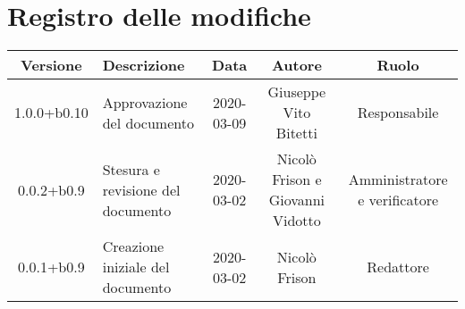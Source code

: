 \section*{Registro delle modifiche}

\begin{center}
	\begin{longtable}{|c|p{3cm}|c|c|c|}
	\hline
	\rowcolor{lighter-grayer}
	\textbf{Versione} & \textbf{Descrizione} & \textbf{Data} & \textbf{Autore} & \textbf{Ruolo} \\
	\hline
	\endfirsthead


	1.0.0+b0.10 & Approvazione del documento & 2020-03-09 & Giuseppe Vito Bitetti & Responsabile \\
	\hline
	0.0.2+b0.9 & Stesura e revisione del documento & 2020-03-02 & Nicolò Frison e Giovanni Vidotto & Amministratore e verificatore \\
	\hline
	0.0.1+b0.9 & Creazione iniziale del documento & 2020-03-02 & Nicolò Frison & Redattore \\
	\hline

	\end{longtable}
\end{center}
